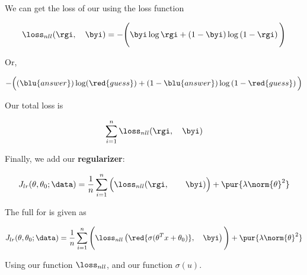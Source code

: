         \begin{kequation}
            We can get the loss of our  using the  loss function
            
            \begin{equation*}
                \loss_{nll}
                (\rgi ,\quad \byi)
                =
                -
                \Bigg(
                    \byi \log{\rgi}
                    +
                    \left( 1 - \byi \right)
                    \log
                    \left( 1-\rgi \right) 
                \Bigg)
            \end{equation*}
            
            Or,
            
            \begin{equation*}
                -
                \Big(
                    (\blu{answer}) \log(\red{guess})
                    +
                    \left( 1 - \blu{answer} \right)
                    \log
                    \left( 1-\red{guess} \right) 
                \Big)
            \end{equation*}
        \end{kequation}
        
        Our total loss is
        
        \begin{equation}
            \sum_{i=1}^n 
            \loss_{nll}(\rgi ,\quad \byi)
        \end{equation}
        
        Finally, we add our \textbf{regularizer}:
        
        \begin{equation}
            J_{lr}(\theta,\theta_0;\data)
            =
            \frac{1}{n} \sum_{i=1}^n 
            \Big(
                \loss_{nll}(\rgi ,\quad \quad \byi)
            \Big)
            +
            \pur{ \lambda \norm{\theta}^2 }
        \end{equation}
        
        \begin{kequation}
            The full  for  is given as
            
            \begin{equation*}
                J_{lr}(\theta,\theta_0;\data)
                =
                \frac{1}{n}
                \sum_{i=1}^n 
                \Bigg(
                    \loss_{nll}
                    \left(
                        \red{\sigma(\theta^T x + \theta_0)} ,\quad \byi
                    \right)
                \Bigg)
                +
                \pur{ \lambda \norm{\theta}^2 }
            \end{equation*}
            
            Using our  function $\loss_{nll}$, and our  function $\sigma(u)$.
            
        \end{kequation}
